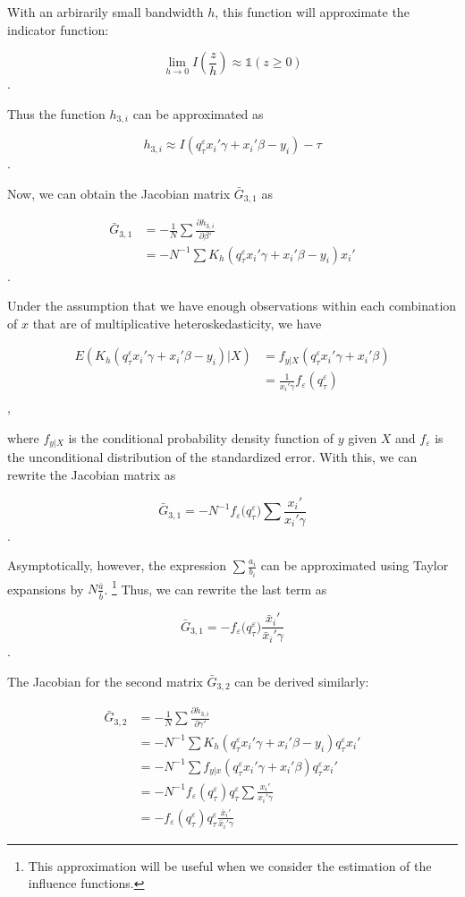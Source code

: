 \documentclass[
  authoryear,
  review,
  1p]{elsarticle}
\begin{document}
With an arbirarily small bandwidth \(h\), this function will approximate
the indicator function:

\[
\lim_{h\rightarrow 0} I\left(\frac{z}{h}\right) \approx \mathbb{1}(z\geq 0)
\].

Thus the function \(h_{3,i}\) can be approximated as

\[h_{3,i} \approx I\left( q^\varepsilon_\tau x_i'\gamma +x_i'\beta - y_i  \right) - \tau\].

Now, we can obtain the Jacobian matrix \(\bar G_{3,1}\) as

\[\begin{aligned}
\bar G_{3,1} &= -\frac{1}{N} \sum \frac{\partial h_{3,i}}{\partial \beta'} \\
             &= -N^{-1} \sum K_h(q^\varepsilon_\tau x_i'\gamma +x_i'\beta - y_i ) x_i'
\end{aligned}
\].

Under the assumption that we have enough observations within each
combination of \(x\) that are of multiplicative heteroskedasticity, we have

\[\begin{aligned}
E(K_h(q^\varepsilon_\tau x_i'\gamma +x_i'\beta - y_i )|X) &= f_{y|X}(q^\varepsilon_\tau x_i'\gamma +x_i'\beta) \\
&=\frac{1}{x_i'\gamma} f_{\varepsilon}(q^\varepsilon_\tau) \\
\end{aligned}
\],

where \(f_{y|X}\) is the conditional probability density function of
\(y\) given \(X\) and \(f_\varepsilon\) is the unconditional
distribution of the standardized error. With this, we can rewrite the
Jacobian matrix as

\[\bar G_{3,1} = -N^{-1} f_{\varepsilon}\big(q^\varepsilon_\tau\big) \sum  \frac{x_i'}{x_i'\gamma} 
\].

Asymptotically, however, the expression \(\sum\frac{a_i}{b_i}\) can be
approximated using Taylor expansions by \(N\frac{\bar a}{\bar b}\).
\footnote{This approximation will be useful when we consider the estimation of the influence functions.} Thus, we can rewrite the last
term as

\[\bar G_{3,1} = - f_{\varepsilon}\big(q^\varepsilon_\tau\big) \frac{\bar x_i'}{\bar x_i'\gamma} 
\].

The Jacobian for the second matrix \(\bar G_{3,2}\) can be derived
similarly:

\[\begin{aligned}
\bar G_{3,2} &= -\frac{1}{N} \sum \frac{\partial h_{3,i}}{\partial \gamma'} \\
             &= -N^{-1} \sum K_h(q^\varepsilon_\tau x_i'\gamma +x_i'\beta - y_i ) q^\varepsilon_\tau x_i' \\
             &=-N^{-1} \sum f_{y|x}(q^\varepsilon_\tau x_i'\gamma +x_i'\beta ) q^\varepsilon_\tau x_i' \\
             &=-N^{-1} f_{\varepsilon}(q^\varepsilon_\tau) q^\varepsilon_\tau \sum \frac{x_i'}{x_i'\gamma} \\
             &=- f_{\varepsilon}(q^\varepsilon_\tau) q^\varepsilon_\tau \frac{\bar x_i'}{\bar x_i'\gamma}
\end{aligned}
\]
\end{document}
